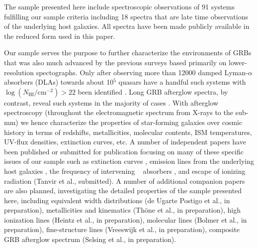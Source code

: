 \documentclass{aa}    %
\begin{document}
The sample presented here include spectroscopic observations of 91 systems
fulfilling our sample criteria including 18 spectra that are late time
observations of the underlying host galaxies. All spectra have been made
publicly available in the reduced form used in this paper.

Our sample serves the purpose to further characterize the environments of GRBs
that was also much advanced by the previous surveys based primarily on
lower-resolution spectographs. Only after observing more than 12000 damped
Lyman-$\alpha$ absorbers (DLAs) towards about 10$^5$ quasars have a handful such
systems with $\log({N_\mathrm{HI}/\mathrm{cm^{-2}}}) > 22$ been identified
\citep[e.g., five in][]{Noterdaeme2012b}. Long GRB afterglow spectra, by
contrast, reveal such systems in the majority of cases \citep[][and this
work]{Jakobsson2006b, Fynbo2009, Cucchiara2015}.  With afterglow spectroscopy
(throughout the electromagnetic spectrum from X-rays to the sub-mm) we hence
characterize the properties of star-forming galaxies over cosmic history in
terms of redshifts, metallicities, molecular contents, ISM temperatures, UV-flux
densities, extinction curves, etc.  A number of independent papers have been
published or submitted for publication focusing on many of these specific issues
of our sample such as extinction curves \citep[][see also \citealt{Fynbo2014,
	Heintz2017}]{Japelj2015, Zafar17}, emission lines from the underlying host
galaxies \citep{Kruhler2015}, the frequency of intervening \mgii~ absorbers
\citep{Christensen2017}, and escape of ionizing radiation (Tanvir et al.,
submitted). A number of additional companion papers are also planned,
investigating the detailed properties of the sample presented here, including
equivalent width distributions (de Ugarte Postigo et al., in preparation),
metallicities and kinematics (Th{\"o}ne et al., in preparation), high ionization
lines (Heintz et al., in preparation), molecular lines (Bolmer et al., in
preparation), fine-structure lines (Vreeswijk et al., in preparation), composite
GRB afterglow spectrum (Selsing et al., in preparation).

\end{document}
